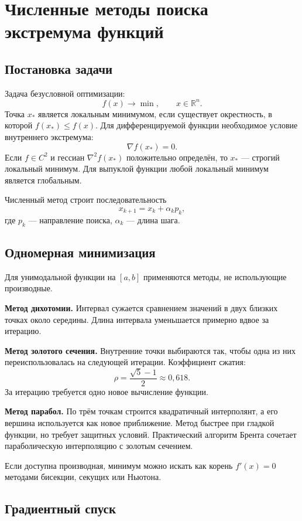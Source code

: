 \section{Численные методы поиска экстремума функций}
\label{sec:numerical-optimization}

\subsection{Постановка задачи}

Задача безусловной оптимизации:
\[
    f(x)\to\min,
    \qquad x\in\mathbb R^n.
\]
Точка $x_*$ является локальным минимумом, если существует окрестность, в которой
$f(x_*)\leq f(x)$. Для дифференцируемой функции необходимое условие внутреннего
экстремума:
\[
    \nabla f(x_*)=0.
\]
Если $f\in C^2$ и гессиан $\nabla^2 f(x_*)$ положительно определён, то $x_*$ ---
строгий локальный минимум. Для выпуклой функции любой локальный минимум является
глобальным.

Численный метод строит последовательность
\[
    x_{k+1}=x_k+\alpha_k p_k,
\]
где $p_k$ --- направление поиска, $\alpha_k$ --- длина шага.

\subsection{Одномерная минимизация}

Для унимодальной функции на $[a,b]$ применяются методы, не использующие
производные.

\textbf{Метод дихотомии.} Интервал сужается сравнением значений в двух близких
точках около середины. Длина интервала уменьшается примерно вдвое за итерацию.

\textbf{Метод золотого сечения.} Внутренние точки выбираются так, чтобы одна из
них переиспользовалась на следующей итерации. Коэффициент сжатия:
\[
    \rho=\frac{\sqrt5-1}{2}\approx0{,}618.
\]
За итерацию требуется одно новое вычисление функции.

\textbf{Метод парабол.} По трём точкам строится квадратичный интерполянт, а его
вершина используется как новое приближение. Метод быстрее при гладкой функции,
но требует защитных условий. Практический алгоритм Брента сочетает параболическую
интерполяцию с золотым сечением.

Если доступна производная, минимум можно искать как корень $f'(x)=0$ методами
бисекции, секущих или Ньютона.

\subsection{Градиентный спуск}

